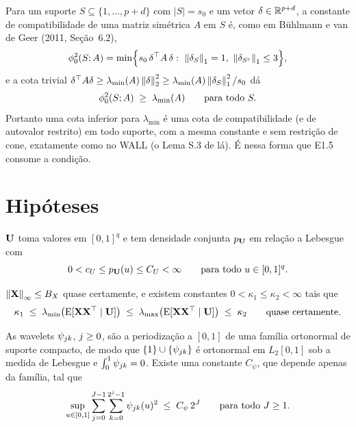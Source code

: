\documentclass[11pt]{article}
\newcommand{\lmin}{\lambda_{\min}}
\newcommand{\lmax}{\lambda_{\max}}
\begin{document}
Para um suporte $S \subseteq \{1, \ldots, p + d\}$ com $|S| = s_0$ e um vetor $\delta \in \mathbb{R}^{p+d}$,
a constante de compatibilidade de uma matriz simétrica $A$ em $S$ é, como em Bühlmann e van de Geer (2011,
Seção~6.2),
\[
    \phi_{0}^2(S; A) = \min\Bigl\{ s_0\,\delta^{\top} A\,\delta :\ \left\lVert \delta_S \right\rVert_1 = 1,\ \left\lVert \delta_{S^c} \right\rVert_1 \le 3 \Bigr\},
\]
e a cota trivial $\delta\T A\delta \ge \lmin(A)\norm{\delta}_2^2 \ge \lmin(A)\norm{\delta_S}_1^2/s_0$ dá
\begin{equation}
    \label{eq:compat-lmin}
    \compat^2(S; A) \;\ge\; \lmin(A) \qquad \text{para todo } S .
\end{equation}
Portanto uma cota inferior para $\lmin$ é uma cota de compatibilidade (e de autovalor restrito) em todo
suporte, com a mesma constante e sem restrição de cone, exatamente como no WALL (o Lema S.3 de lá). É nessa
forma que E1.5 consome a condição.

\section*{Hipóteses}

\begin{assumption}
\label{ass:U}
$\mathbf{U}$ toma valores em $[0,1]^q$ e tem densidade conjunta $p_{\mathbf{U}}$ em relação a Lebesgue com
\[
    0 < c_U \le p_{\mathbf{U}}(u) \le C_U < \infty \qquad \text{para todo } u \in [0,1]^q .
\]
\end{assumption}

\begin{assumption}
\label{ass:X}
$\left\lVert \mathbf{X} \right\rVert_\infty \le B_X$ quase certamente, e existem constantes $0 < \kappa_1 \le \kappa_2 < \infty$ tais que
\[
    \kappa_1 \;\le\; \lmin\bigl(\E[\bX\bX\T \mid \bU]\bigr) \;\le\; \lmax\bigl(\E[\bX\bX\T \mid \bU]\bigr) \;\le\; \kappa_2
    \qquad \text{quase certamente.}
\]
\end{assumption}

\begin{assumption}
\label{ass:psi}
As wavelets $\psi_{jk}$, $j \ge 0$, são a periodização a $[0,1]$ de uma família ortonormal de
suporte compacto, de modo que $\{1\} \cup \{\psi_{jk}\}$ é ortonormal em $L_2[0,1]$ sob a medida de
Lebesgue e $\int_0^1 \psi_{jk} = 0$. Existe uma constante $C_\psi$, que depende apenas da família,
tal que
\begin{equation}
    \label{eq:pointwise}
    \sup_{u \in [0,1]} \sum_{j=0}^{J-1}\sum_{k=0}^{2^{j}-1} \psi_{jk}(u)^2 \;\le\; C_\psi\, 2^{J}
    \qquad \text{para todo } J \ge 1 .
\end{equation}
\end{assumption}
\end{document}
